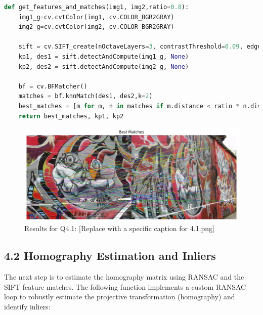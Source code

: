 \documentclass[10pt,a4paper,twocolumn]{article}
\begin{document}
\vspace{2pt}
\begin{lstlisting}[language=Python, style=mystyle]
def get_features_and_matches(img1, img2,ratio=0.8):
    img1_g=cv.cvtColor(img1, cv.COLOR_BGR2GRAY)
    img2_g=cv.cvtColor(img2, cv.COLOR_BGR2GRAY)

    sift = cv.SIFT_create(nOctaveLayers=3, contrastThreshold=0.09, edgeThreshold=25, sigma=1)
    kp1, des1 = sift.detectAndCompute(img1_g, None)
    kp2, des2 = sift.detectAndCompute(img2_g, None)

    bf = cv.BFMatcher()
    matches = bf.knnMatch(des1, des2,k=2)
    best_matches = [m for m, n in matches if m.distance < ratio * n.distance]
    return best_matches, kp1, kp2
\end{lstlisting}

\begin{figure}[H]
    \centering
    \includegraphics[width=0.95\columnwidth]{fig/4.1.png}
    \caption{Results for Q4.1: [Replace with a specific caption for 4.1.png]}
    \label{fig:q4_1}
\end{figure}


\subsection*{4.2 Homography Estimation and Inliers}

The next step is to estimate the homography matrix using RANSAC and the SIFT feature matches. The following function implements a custom RANSAC loop to robustly estimate the projective transformation (homography) and identify inliers:
\end{document}
